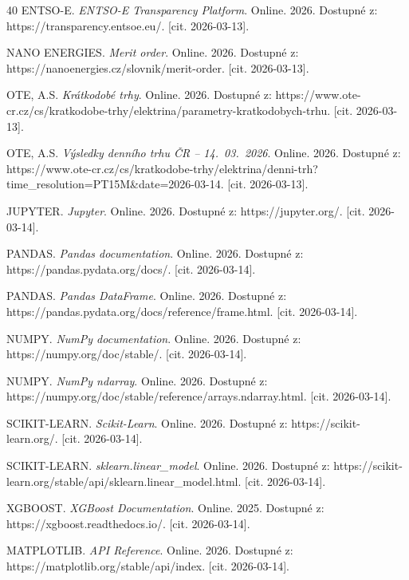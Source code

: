 \documentclass[a4paper]{article}
\begin{document}
\newpage
\begin{thebibliography}{40}
 ENTSO-E. \textit{ENTSO-E Transparency Platform}. Online. 2026. Dostupné z: https://transparency.entsoe.eu/. [cit. 2026-03-13].

 NANO ENERGIES. \textit{Merit order}. Online. 2026. Dostupné z: https://nanoenergies.cz/slovnik/merit-order. [cit. 2026-03-13].

 OTE, A.S. \textit{Krátkodobé trhy}. Online. 2026. Dostupné z: https://www.ote-cr.cz/cs/kratkodobe-trhy/elektrina/parametry-kratkodobych-trhu. [cit. 2026-03-13]. 

 OTE, A.S. \textit{Výsledky denního trhu ČR -- 14.~03.~2026}. Online. 2026. Dostupné z: https://www.ote-cr.cz/cs/kratkodobe-trhy/elektrina/denni-trh?time\_resolution=PT15M\&date=2026-03-14. [cit. 2026-03-13].

 JUPYTER. \textit{Jupyter}. Online. 2026. Dostupné z: https://jupyter.org/. [cit. 2026-03-14].

 PANDAS. \textit{Pandas documentation}. Online. 2026. Dostupné z: https://pandas.pydata.org/docs/. [cit. 2026-03-14].

 PANDAS. \textit{Pandas DataFrame}. Online. 2026. Dostupné z: https://pandas.pydata.org/docs/reference/frame.html. [cit. 2026-03-14].

 NUMPY. \textit{NumPy documentation}. Online. 2026. Dostupné z: https://numpy.org/doc/stable/. [cit. 2026-03-14].

 NUMPY. \textit{NumPy ndarray}. Online. 2026. Dostupné z: https://numpy.org/doc/stable/reference/arrays.ndarray.html. [cit. 2026-03-14].

 SCIKIT-LEARN. \textit{Scikit-Learn}. Online. 2026. Dostupné z: https://scikit-learn.org/. [cit. 2026-03-14].

 SCIKIT-LEARN. \textit{sklearn.linear\_model}. Online. 2026. Dostupné z: https://scikit-learn.org/stable/api/sklearn.linear\_model.html. [cit. 2026-03-14].

 XGBOOST. \textit{XGBoost Documentation}. Online. 2025. Dostupné z: https://xgboost.readthedocs.io/. [cit. 2026-03-14].

 MATPLOTLIB. \textit{API Reference}. Online. 2026. Dostupné z: https://matplotlib.org/stable/api/index. [cit. 2026-03-14].


\end{thebibliography}
\end{document}
